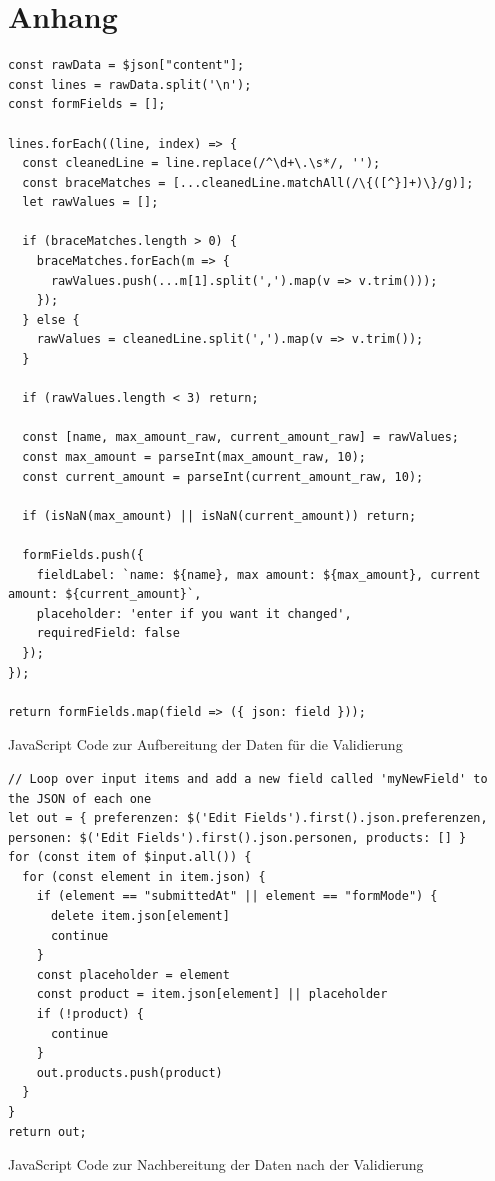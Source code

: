 \section{Anhang}\label{sec:anhang} %
\begin{listing}[htbp]
\begin{verbatim}
const rawData = $json["content"];
const lines = rawData.split('\n');
const formFields = [];

lines.forEach((line, index) => {
  const cleanedLine = line.replace(/^\d+\.\s*/, '');
  const braceMatches = [...cleanedLine.matchAll(/\{([^}]+)\}/g)];
  let rawValues = [];

  if (braceMatches.length > 0) {
    braceMatches.forEach(m => {
      rawValues.push(...m[1].split(',').map(v => v.trim()));
    });
  } else {
    rawValues = cleanedLine.split(',').map(v => v.trim());
  }

  if (rawValues.length < 3) return;

  const [name, max_amount_raw, current_amount_raw] = rawValues;
  const max_amount = parseInt(max_amount_raw, 10);
  const current_amount = parseInt(current_amount_raw, 10);

  if (isNaN(max_amount) || isNaN(current_amount)) return;

  formFields.push({
    fieldLabel: `name: ${name}, max amount: ${max_amount}, current amount: ${current_amount}`,
    placeholder: 'enter if you want it changed',
    requiredField: false
  });
});

return formFields.map(field => ({ json: field }));
\end{verbatim}
\caption{JavaScript Code zur Aufbereitung der Daten für die Validierung}
\label{lst:descr:js:code1}
\end{listing}

\begin{listing}[htbp]
\begin{verbatim}
// Loop over input items and add a new field called 'myNewField' to the JSON of each one
let out = { preferenzen: $('Edit Fields').first().json.preferenzen, personen: $('Edit Fields').first().json.personen, products: [] }
for (const item of $input.all()) {
  for (const element in item.json) {
    if (element == "submittedAt" || element == "formMode") {
      delete item.json[element]
      continue
    }
    const placeholder = element
    const product = item.json[element] || placeholder
    if (!product) {
      continue
    }
    out.products.push(product)
  }
}
return out;
\end{verbatim}
\caption{JavaScript Code zur Nachbereitung der Daten nach der Validierung}
\label{lst:descr:js:code2}
\end{listing}

